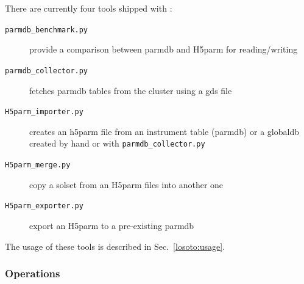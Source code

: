There are currently four tools shipped with \losoto{}:
\begin{description}
 \item[\texttt{parmdb\_benchmark.py}] provide a comparison between parmdb and H5parm for reading/writing
 \item[\texttt{parmdb\_collector.py}] fetches parmdb tables from the cluster using a gds file
 \item[\texttt{H5parm\_importer.py}] creates an h5parm file from an instrument table (parmdb) or a globaldb created by hand or with \texttt{parmdb\_collector.py}
 \item[\texttt{H5parm\_merge.py}] copy a solset from an H5parm files into another one
 \item[\texttt{H5parm\_exporter.py}] export an H5parm to a pre-existing parmdb
\end{description}

The usage of these tools is described in Sec.~\ref{losoto:usage}.

\subsubsection{Operations}
\label{losoto:operations}

